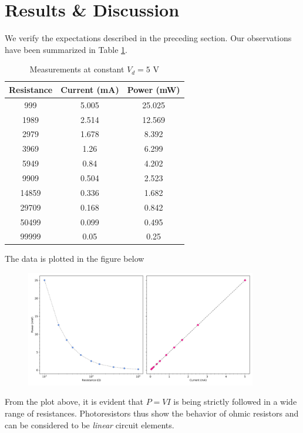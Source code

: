 \documentclass{article}
\begin{document}
	\section*{Results \& Discussion}
	We verify the expectations described in the preceding section. Our observations have been summarized in Table \ref{tab:data}.
	\begin{table}[h!]
		\centering
		\begin{tabular}{|c|c|c|}
			\hline
			Resistance & Current (mA) & Power (mW)\\
			\hline
			999 & 5.005 & 25.025\\
			1989 & 2.514 & 12.569\\
			2979 & 1.678 & 8.392\\
			3969 & 1.26 & 6.299\\
			5949 & 0.84 & 4.202\\
			9909 & 0.504 & 2.523\\
			14859 & 0.336 & 1.682\\
			29709 & 0.168 & 0.842\\
			50499 & 0.099 & 0.495\\
			99999 & 0.05 & 0.25\\
			\hline
		\end{tabular}
		\caption{Measurements at constant $V_d = 5$ V}
		\label{tab:data}
	\end{table}

	The data is plotted in the figure below
	
	\begin{figure}[h]
		\centering
		\includegraphics[width=0.9\textwidth]{power_characs}
	\end{figure}

From the plot above, it is evident that $P = VI$ is being strictly followed in a wide range of resistances. Photoresistors thus show the behavior of ohmic resistors and can be considered to be {\it linear} circuit elements.
\end{document}
